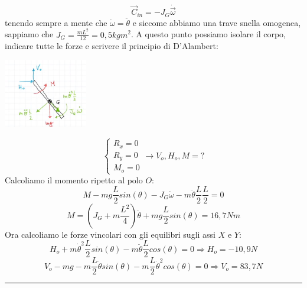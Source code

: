 \[
    \vec{C}_{in} = - J_G \dot{\vec{\omega}}
\]
tenendo sempre a mente che $\dot{\omega} = \ddot{\theta}$ e siccome abbiamo una trave snella omogenea, sappiamo che $J_G = \frac{m L^2}{12} = 0,5 kg m^2$.\newline
\newline
A questo punto possiamo isolare il corpo, indicare tutte le forze e scrivere il principio di D'Alambert:
\begin{center}
    \includegraphics[height=3cm]{../lezione9/img7.JPG}
\end{center}
\[
    \begin{cases}
        R_x = 0\\
        R_y = 0\\
        M_o = 0
    \end{cases} \rightarrow V_o, H_o, M = ?
\]
Calcoliamo il momento ripetto al polo $O$:
\[
    M - mg \frac{L}{2}sin(\theta) - J_G \dot{\omega} - m \ddot{\theta} \frac{L}{2} \frac{L}{2} = 0
\]
\[
    M = \left(J_G + m \frac{L^2}{4}\right) \ddot{\theta} + mg \frac{L}{2} sin(\theta) = 16,7 Nm 
\]
Ora calcoliamo le forze vincolari con gli equilibri sugli assi $X$ e $Y$:
\[
    H_o + m \dot{\theta}^2 \frac{L}{2} sin(\theta) - m \ddot{\theta} \frac{L}{2} cos(\theta) = 0 \Rightarrow H_o = -10,9 N
\]
\[
    V_o - mg - m \frac{L}{2} \ddot{\theta} sin(\theta) - m \frac{L}{2}\dot{\theta}^2 cos(\theta) = 0 \Rightarrow V_o = 83,7N
\]
\rule{\textwidth}{0,4pt}
